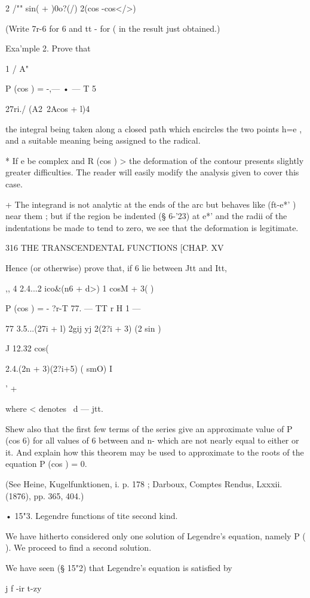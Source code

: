 {{2 /"" sin( + )0o?(/) 2(cos -cos</>)

(Write 7r-6 for 6 and tt - for ( in the result just obtained.)

Exa'mple 2. Prove that

1 / A"

P (cos ) = -,— • — T 5

27ri./ (A2\ 2Acos + l)4

the integral being taken along a closed path which encircles the two
points h=e , and a suitable meaning being assigned to the radical.

* If e be complex and R (cos ) > the deformation of the contour
presents slightly greater difficulties. The reader will easily modify
the analysis given to cover this case.

+ The integrand is not analytic at the ends of the arc but behaves
like (ft-e*' )~ near them ; but if the region be indented (§ 6-'23) at
e*' and the radii of the indentations be made to tend to zero, we see
that the deformation is legitimate.

316 THE TRANSCENDENTAL FUNCTIONS [CHAP. XV

Hence (or otherwise) prove that, if 6 lie between Jtt and Itt,

,, 4 2.4...2 ico\&(n6 + d>) 1 cosM + 3( )\

P (cos ) = - ?r-T 77. — TT r H 1 —

77 3.5...(27i + l) 2gij yj 2(2?i + 3) (2 sin )

J 12.32 cos(%

2.4.(2n + 3)(2?i+5) ( smO) I

' +

where < denotes \ d — jtt.

Shew also that the first few terms of the series give an approximate
value of P (cos 6) for all values of 6 between and n- which are not
nearly equal to either or it. And explain how this theorem may be used
to approximate to the roots of the equation P (cos ) = 0.

(See Heine, Kugelfunktionen, i. p. 178 ; Darboux, Comptes Rendus,
Lxxxii. (1876), pp. 365, 404.)

• 15"3. Legendre functions of tite second kind.

We have hitherto considered only one solution of Legendre's equation,
namely P ( ). We proceed to find a second solution.

We have seen (§ 15"2) that Legendre's equation is satisfied by

j f -ir t-zy

}}
